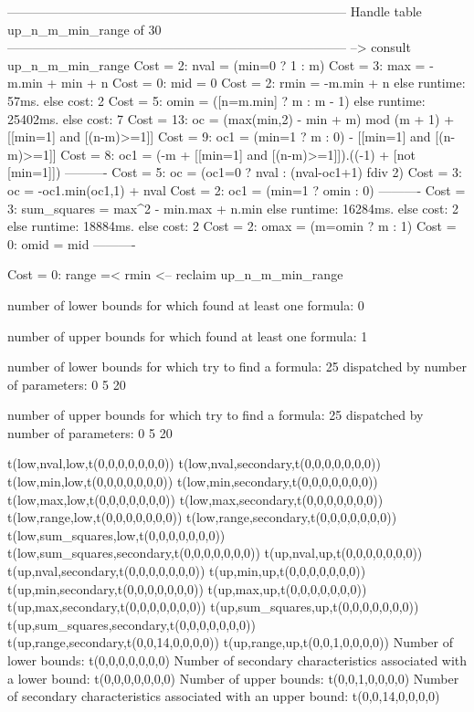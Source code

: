 --------------------------------------------------------------------------------
Handle table up_n_m_min_range of 30
--------------------------------------------------------------------------------
--> consult up_n_m_min_range
Cost =  2:  nval        = (min=0 ? 1 : m)
Cost =  3:  max         = -m.min + min + n
Cost =  0:  mid         = 0
Cost =  2:  rmin        = -m.min + n
else runtime: 57ms. else cost: 2
Cost =  5:  omin        = ([n=m.min] ? m : m - 1) %
else runtime: 25402ms. else cost: 7
Cost = 13:  oc          = (max(min,2) - min + m) mod (m + 1) + [[min=1] and [(n-m)>=1]] %
Cost =  9:  oc1         = (min=1 ? m : 0) - [[min=1] and [(n-m)>=1]] %
Cost =  8:  oc1         = (-m + [[min=1] and [(n-m)>=1]]).((-1) + [not [min=1]]) %
----------
Cost =  5:  oc          = (oc1=0 ? nval : (nval-oc1+1) fdiv 2)
Cost =  3:  oc          = -oc1.min(oc1,1) + nval
Cost =  2:  oc1         = (min=1 ? omin : 0)
----------
Cost =  3:  sum_squares = max^2 - min.max + n.min
else runtime: 16284ms. else cost: 2
else runtime: 18884ms. else cost: 2
Cost =  2:  omax        = (m=omin ? m : 1)
Cost =  0:  omid        = mid
----------

Cost =  0:  range =< rmin
<-- reclaim up_n_m_min_range

number of lower bounds for which found at least one formula: 0

number of upper bounds for which found at least one formula: 1

number of lower bounds for which try to find a formula: 25
dispatched by number of parameters: 0  5  20

number of upper bounds for which try to find a formula: 25
dispatched by number of parameters: 0  5  20

t(low,nval,low,t(0,0,0,0,0,0,0))
t(low,nval,secondary,t(0,0,0,0,0,0,0))
t(low,min,low,t(0,0,0,0,0,0,0))
t(low,min,secondary,t(0,0,0,0,0,0,0))
t(low,max,low,t(0,0,0,0,0,0,0))
t(low,max,secondary,t(0,0,0,0,0,0,0))
t(low,range,low,t(0,0,0,0,0,0,0))
t(low,range,secondary,t(0,0,0,0,0,0,0))
t(low,sum_squares,low,t(0,0,0,0,0,0,0))
t(low,sum_squares,secondary,t(0,0,0,0,0,0,0))
t(up,nval,up,t(0,0,0,0,0,0,0))
t(up,nval,secondary,t(0,0,0,0,0,0,0))
t(up,min,up,t(0,0,0,0,0,0,0))
t(up,min,secondary,t(0,0,0,0,0,0,0))
t(up,max,up,t(0,0,0,0,0,0,0))
t(up,max,secondary,t(0,0,0,0,0,0,0))
t(up,sum_squares,up,t(0,0,0,0,0,0,0))
t(up,sum_squares,secondary,t(0,0,0,0,0,0,0))
t(up,range,secondary,t(0,0,14,0,0,0,0))
t(up,range,up,t(0,0,1,0,0,0,0))
Number of lower bounds:                                             t(0,0,0,0,0,0,0)
Number of secondary characteristics associated with a lower bound:  t(0,0,0,0,0,0,0)
Number of upper bounds:                                             t(0,0,1,0,0,0,0)
Number of secondary characteristics associated with an upper bound: t(0,0,14,0,0,0,0)

